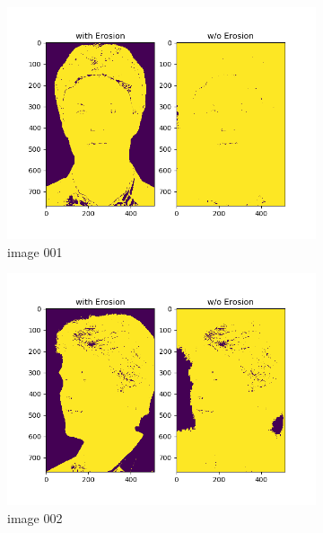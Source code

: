 \documentclass[11pt]{report}
\begin{document}
\begin{figure}[H]
    \centering
    \begin{subfigure}{0.4\textwidth}
        \centering
        \includegraphics[width=\textwidth]{Task 2 Plots/skin_color_mask_erode_001.png}
        \caption{image 001}
        \label{fig:skin_colormask_erode1}
    \end{subfigure}
    \begin{subfigure}{0.4\textwidth}
        \centering
        \includegraphics[width=\textwidth]{Task 2 Plots/skin_color_mask_erode_002.png}
        \caption{image 002}
        \label{fig:skin_colormask_erode2}
    \end{subfigure}
    \begin{subfigure}{0.4\textwidth}

\end{subfigure}
\end{figure}
\end{document}
